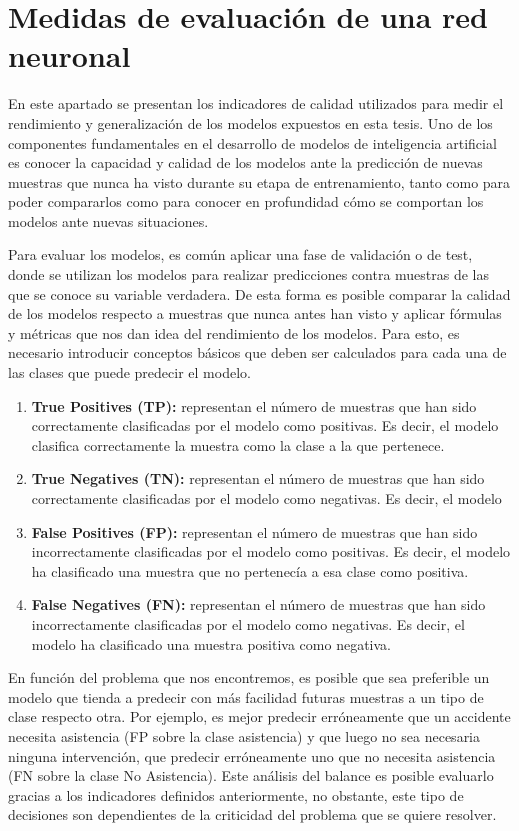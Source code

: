 \documentclass{uathesis-es}
\begin{document}
	\section{Medidas de evaluación de una red neuronal}
	
	En este apartado se presentan los indicadores de calidad utilizados para medir el rendimiento y generalización de los modelos expuestos en esta tesis. Uno de los componentes fundamentales en el desarrollo de modelos de inteligencia artificial es conocer la capacidad y calidad de los modelos ante la predicción de nuevas muestras que nunca ha visto durante su etapa de entrenamiento, tanto como para poder compararlos como para conocer en profundidad cómo se comportan los modelos ante nuevas situaciones.
	
	Para evaluar los modelos, es común aplicar una fase de validación o de test, donde se utilizan los modelos para realizar predicciones contra muestras de las que se conoce su variable verdadera. De esta forma es posible comparar la calidad de los modelos respecto a muestras que nunca antes han visto y aplicar fórmulas y métricas que nos dan idea del rendimiento de los modelos. Para esto, es necesario introducir conceptos básicos que deben ser calculados para cada una de las clases que puede predecir el modelo.
	
	\begin{enumerate}
		\item \textbf{True Positives (TP):} representan el número de muestras que han sido correctamente clasificadas por el modelo como positivas. Es decir, el modelo clasifica correctamente la muestra como la clase a la que pertenece.
		\item \textbf{True Negatives (TN):} representan el número de muestras que han sido correctamente clasificadas por el modelo como negativas. Es decir, el modelo
		\item \textbf{False Positives (FP):} representan el número de muestras que han sido incorrectamente clasificadas por el modelo como positivas. Es decir, el modelo ha clasificado una muestra que no pertenecía a esa clase como positiva.
		\item \textbf{False Negatives (FN):} representan el número de muestras que han sido incorrectamente clasificadas por el modelo como negativas. Es decir, el modelo ha clasificado una muestra positiva como negativa.
	\end{enumerate}
	
	En función del problema que nos encontremos, es posible que sea preferible un modelo que tienda a predecir con más facilidad futuras muestras a un tipo de clase respecto otra. Por ejemplo, es mejor predecir erróneamente que un accidente necesita asistencia (FP sobre la clase asistencia) y que luego no sea necesaria ninguna intervención, que predecir erróneamente uno que no necesita asistencia (FN sobre la clase No Asistencia). Este análisis del balance es posible evaluarlo gracias a los indicadores definidos anteriormente, no obstante, este tipo de decisiones son dependientes de la criticidad del problema que se quiere resolver.
	
\end{document}
